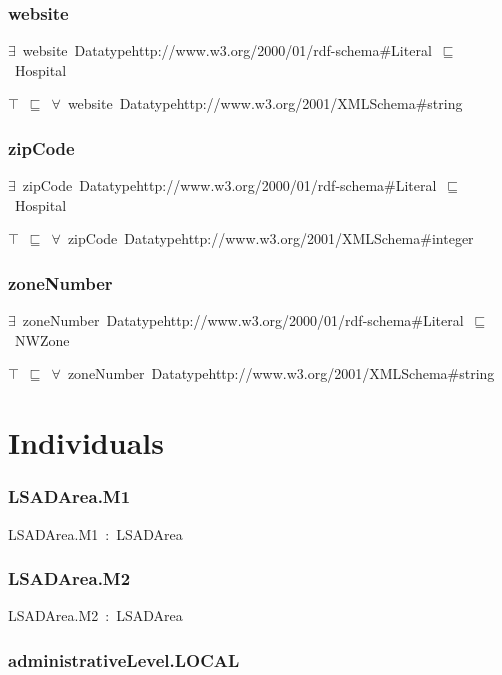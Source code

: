 \documentclass{article}
\begin{document}
\subsubsection*{website}

\ensuremath{\exists}~website~Datatypehttp://www.w3.org/2000/01/rdf-schema#Literal~\ensuremath{\sqsubseteq}~Hospital

\ensuremath{\top}~\ensuremath{\sqsubseteq}~\ensuremath{\forall}~website~Datatypehttp://www.w3.org/2001/XMLSchema#string

\subsubsection*{zipCode}

\ensuremath{\exists}~zipCode~Datatypehttp://www.w3.org/2000/01/rdf-schema#Literal~\ensuremath{\sqsubseteq}~Hospital

\ensuremath{\top}~\ensuremath{\sqsubseteq}~\ensuremath{\forall}~zipCode~Datatypehttp://www.w3.org/2001/XMLSchema#integer

\subsubsection*{zoneNumber}

\ensuremath{\exists}~zoneNumber~Datatypehttp://www.w3.org/2000/01/rdf-schema#Literal~\ensuremath{\sqsubseteq}~NWZone

\ensuremath{\top}~\ensuremath{\sqsubseteq}~\ensuremath{\forall}~zoneNumber~Datatypehttp://www.w3.org/2001/XMLSchema#string

\section*{Individuals}\subsubsection*{LSADArea.M1}

LSADArea.M1~:~LSADArea

\subsubsection*{LSADArea.M2}

LSADArea.M2~:~LSADArea

\subsubsection*{administrativeLevel.LOCAL}
\end{document}
